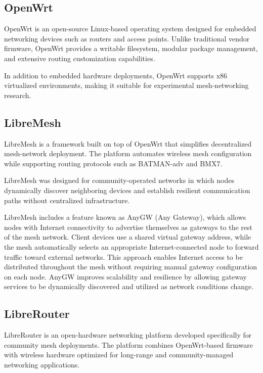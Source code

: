\documentclass[conference]{IEEEtran}
\begin{document}
\subsection{OpenWrt}

OpenWrt is an open-source Linux-based operating system designed for embedded networking devices such as routers and access points. Unlike traditional vendor firmware, OpenWrt provides a writable filesystem, modular package management, and extensive routing customization capabilities.

In addition to embedded hardware deployments, OpenWrt supports x86 virtualized environments, making it suitable for experimental mesh-networking research.

\subsection{LibreMesh}

LibreMesh is a framework built on top of OpenWrt that simplifies decentralized mesh-network deployment. The platform automates wireless mesh configuration while supporting routing protocols such as BATMAN-adv and BMX7.

LibreMesh was designed for community-operated networks in which nodes dynamically discover neighboring devices and establish resilient communication paths without centralized infrastructure.

LibreMesh includes a feature known as AnyGW (Any Gateway), which allows nodes with Internet connectivity to advertise themselves as gateways to the rest of the mesh network. Client devices use a shared virtual gateway address, while the mesh automatically selects an appropriate Internet-connected node to forward traffic toward external networks. This approach enables Internet access to be distributed throughout the mesh without requiring manual gateway configuration on each node. AnyGW improves scalability and resilience by allowing gateway services to be dynamically discovered and utilized as network conditions change. \cite{libremesh_anygw,libremesh_howitworks}

\subsection{LibreRouter}

LibreRouter is an open-hardware networking platform developed specifically for community mesh deployments. The platform combines OpenWrt-based firmware with wireless hardware optimized for long-range and community-managed networking applications.
\end{document}
